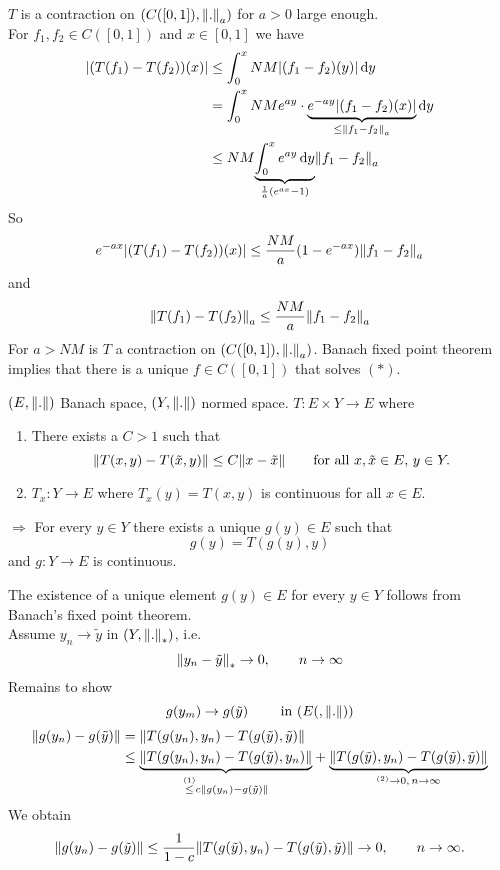 \begin{beispiel}
	$T$ is a contraction on $(C([0,1]),\norm{.}_a)$ for $a >0$ large enough. \\
	For $f_1,f_2 \in C([0,1])$ and $x \in [0,1]$ we have
	\begin{align*}
		\abs{(T(f_1)-T(f_2))(x)} &\leq \int_{0}^{x} NM \abs{(f_1-f_2)(y)} \,\mathrm{d}y \\
		&= \int_{0}^{x}NM e^{ay} \cdot \underset{\leq \norm{f_1-f_2}_a}{\underbrace{e^{-ay} \abs{(f_1-f_2)(x)}}} \,\mathrm{d}y \\
		&\leq NM \underset{\frac{1}{a}(e^{ax}-1)}{\underbrace{\int_{0}^{x} e^{ay} \,\mathrm{d}y}} \norm{f_1-f_2}_a 
	\end{align*}
	So
	\[
		e^{-ax} \abs{(T(f_1)-T(f_2))(x)} \leq \frac{NM}{a}(1-e^{-ax})\norm{f_1-f_2}_a
	\]
	and
	\[
		\norm{T(f_1)-T(f_2)}_a \leq  \frac{NM}{a} \norm{f_1-f_2}_a
	\]
	For $a > NM$ is $T$ a contraction on $(C([0,1]),\norm{.}_a)$. Banach fixed point theorem implies that there is a unique $f \in C([0,1])$ that solves $(*)$.
\end{beispiel}
\begin{theorem}
	$(E,\norm{.})$ Banach space, $(Y,\norm{.})$ normed space. $T: E \times Y \to E$ where
	\begin{enumerate}[(1)]
		\item There exists a $C > 1$ such that
		\[
			\norm{T(x,y)-T(\tilde x,y)} \leq C \norm{x - \tilde x} \qquad \text{for all }x, \tilde x \in E,\, y \in Y.
		\]
		\item $T_x: Y \to E$ where $T_x(y)= T(x,y)$ is continuous for all $x \in E$.
	\end{enumerate}
	$\Rightarrow $ For every $y \in Y$ there exists a unique $g(y) \in E$ such that \[
		g(y)= T(g(y),y)
	\] and $g: Y \to E$ is continuous.
\end{theorem}
\begin{beweis}
	The existence of a unique element $g(y) \in E$ for every $y \in Y$ follows from Banach's fixed point theorem. \\
	Assume $y_n \to \tilde y$ in $(Y, \norm{.}_{*})$, i.e. \[
		\norm{y_n - \tilde y}_* \to 0, \qquad n \to \infty
	\]
	Remains to show
	\[
		g(y_m) \to g(\tilde y) \qquad \text{ in }(E(,\norm{.}))
	\]
	\begin{align*}
		\norm{g(y_n)- g( \tilde y)} &= \norm{T(g(y_n),y_n) - T(g(\tilde y), \tilde y)} \\
		&\leq  \underset{ \stackrel{(1)}{\leq } c \norm{g(y_n)-g(\tilde y)}}{\underbrace{\norm{T(g(y_n),y_n) - T(g( \tilde y),y_n)}}} + 
		\underset{^{(2)}\to 0, \, n \to \infty}{\underbrace{\norm{T(g(\tilde y),y_n)- T(g(\tilde y),\tilde y)}}}
	\end{align*}
	We obtain
	\[
		\norm{g(y_n)-g(\tilde y)} \leq \frac{1}{1-c} \norm{T(g(\tilde y), y_n) - T(g(\tilde y),\tilde y)} \to 0, \qquad n \to \infty.
	\]
\end{beweis}

